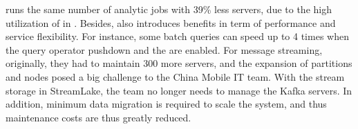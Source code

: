  \sys runs the same number of analytic jobs with 39\% less servers, due to the high utilization of  in \sys. Besides, \sys also introduces  benefits in term of performance and service flexibility. For instance, some batch queries can speed up to 4 times when the query operator pushdown and the \brain are enabled. 
 For message streaming, originally, they had to maintain 300 more \kafka servers, and the expansion of partitions and nodes posed a big challenge to the China Mobile IT team. With the stream storage in StreamLake, the team no longer needs to  manage the Kafka servers. In addition, minimum data migration is required to scale the system, and thus maintenance costs are thus greatly reduced. 
 

























